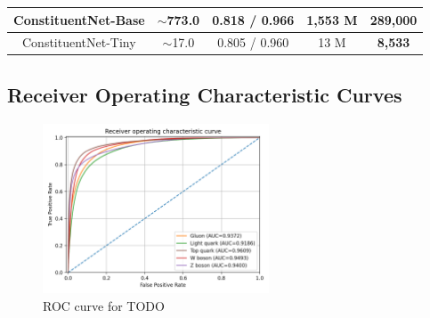 \begin{table}[!hpt]
\begin{tabular}{|c|c|c|c|c|}
  ConstituentNet-Base \cite{3-yuan2021constituentnet:}                                                   & $\sim$773.0                                                                         & 0.818 / \textbf{0.966}            & 1,553 M            & 289,000             \\ \hline
  ConstituentNet-Tiny \cite{3-yuan2021constituentnet:}                                                   & $\sim$17.0                                                                        & 0.805 / 0.960            & 13 M              & \textbf{8,533}               \\ \hline
  \end{tabular}
  \egroup
\end{table}


\subsection{Receiver Operating Characteristic Curves}

\indo{|}

\begin{figure}[hpt!]
  \centering
  \includegraphics[trim={0cm 0cm 0cm 0cm}, width=0.6\textwidth, center]{../logs/ROC.png}
  \caption{ROC curve for TODO}
  \label{fig:ROC}
\end{figure}

\indo{|}
\indo{|}

